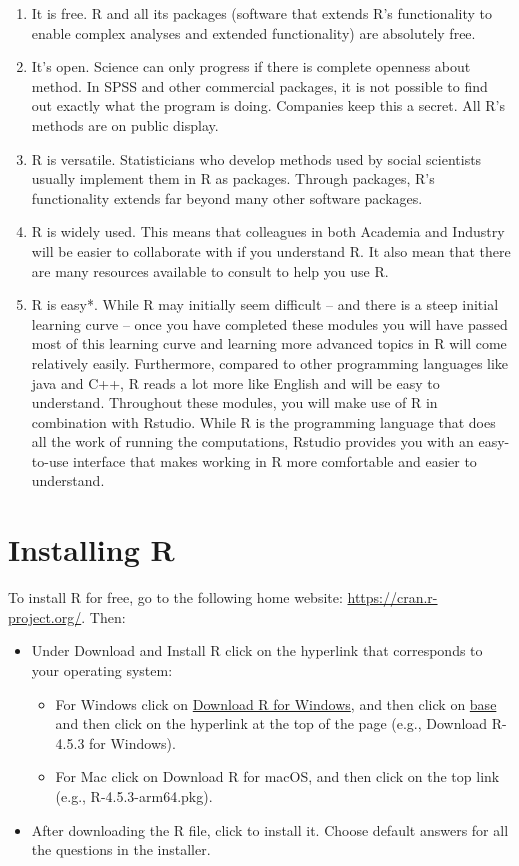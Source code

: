 \documentclass[
]{book}
\begin{document}
\begin{enumerate}
\def\labelenumi{\arabic{enumi}.}
\item
  It is free. R and all its packages (software that extends R's functionality to enable complex analyses and extended functionality) are absolutely free.
\item
  It's open. Science can only progress if there is complete openness about method. In SPSS and other commercial packages, it is not possible to find out exactly what the program is doing. Companies keep this a secret. All R's methods are on public display.
\item
  R is versatile. Statisticians who develop methods used by social scientists usually implement them in R as packages. Through packages, R's functionality extends far beyond many other software packages.
\item
  R is widely used. This means that colleagues in both Academia and Industry will be easier to collaborate with if you understand R. It also mean that there are many resources available to consult to help you use R.
\item
  R is easy*. While R may initially seem difficult -- and there is a steep initial learning curve -- once you have completed these modules you will have passed most of this learning curve and learning more advanced topics in R will come relatively easily. Furthermore, compared to other programming languages like java and C++, R reads a lot more like English and will be easy to understand. Throughout these modules, you will make use of R in combination with Rstudio. While R is the programming language that does all the work of running the computations, Rstudio provides you with an easy-to-use interface that makes working in R more comfortable and easier to understand.
\end{enumerate}

\section{Installing R}\label{installing-r}

To install R for free, go to the following home website: \url{https://cran.r-project.org/}. Then:

\begin{itemize}
\item
  Under Download and Install R click on the hyperlink that corresponds to your operating system:

  \begin{itemize}
  \item
    For Windows click on \ul{Download R for Windows}, and then click on \ul{base} and then click on the hyperlink at the top of the page (e.g., Download R-4.5.3 for Windows).
  \item
    For Mac click on Download R for macOS, and then click on the top link (e.g., R-4.5.3-arm64.pkg).
  \end{itemize}
\item
  After downloading the R file, click to install it. Choose default answers for all the questions in the installer.
\end{itemize}
\end{document}
